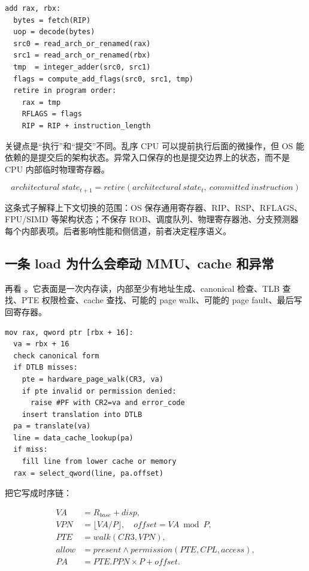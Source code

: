 \begin{lstlisting}
add rax, rbx:
  bytes = fetch(RIP)
  uop = decode(bytes)
  src0 = read_arch_or_renamed(rax)
  src1 = read_arch_or_renamed(rbx)
  tmp  = integer_adder(src0, src1)
  flags = compute_add_flags(src0, src1, tmp)
  retire in program order:
    rax = tmp
    RFLAGS = flags
    RIP = RIP + instruction_length
\end{lstlisting}

关键点是“执行”和“提交”不同。乱序 CPU 可以提前执行后面的微操作，但 OS 能依赖的是提交后的架构状态。异常入口保存的也是提交边界上的状态，而不是 CPU 内部临时物理寄存器。

\[
architectural\ state_{t+1}
= retire(architectural\ state_t,\ committed\ instruction)
\]

这条式子解释上下文切换的范围：OS 保存通用寄存器、RIP、RSP、RFLAGS、FPU/SIMD 等架构状态；不保存 ROB、调度队列、物理寄存器池、分支预测器每个内部表项。后者影响性能和侧信道，前者决定程序语义。

\subsection{一条 load 为什么会牵动 MMU、cache 和异常}

再看 。它表面是一次内存读，内部至少有地址生成、canonical 检查、TLB 查找、PTE 权限检查、cache 查找、可能的 page walk、可能的 page fault、最后写回寄存器。

\begin{lstlisting}
mov rax, qword ptr [rbx + 16]:
  va = rbx + 16
  check canonical form
  if DTLB misses:
    pte = hardware_page_walk(CR3, va)
    if pte invalid or permission denied:
      raise #PF with CR2=va and error_code
    insert translation into DTLB
  pa = translate(va)
  line = data_cache_lookup(pa)
  if miss:
    fill line from lower cache or memory
  rax = select_qword(line, pa.offset)
\end{lstlisting}

把它写成时序链：

\[
\begin{aligned}
VA &= R_{base}+disp,\\
VPN &= \lfloor VA / P \rfloor,\quad offset=VA\bmod P,\\
PTE &= walk(CR3, VPN),\\
allow &= present \land permission(PTE, CPL, access),\\
PA &= PTE.PPN \times P + offset.
\end{aligned}
\]

